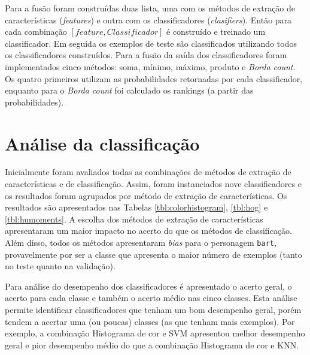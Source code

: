 \documentclass[journal]{IEEEtran}
\begin{document}
Para a fusão foram construídas duas lista, uma com os métodos de extração de características ({\it features}) e outra com os classificadores ({\it clasifiers}).
Então para cada combinação $[feature, Classificador]$ é construído e treinado um classificador.
Em seguida os exemplos de teste são classificados utilizando todos os classificadores construídos.
Para a fusão da saída dos classificadores foram implementados cinco métodos: soma, mínimo, máximo, produto e {\it Borda count}.
Os quatro primeiros utilizam as probabilidades retornadas por cada classificador, 
enquanto para o {\it Borda count} foi calculado os rankings (a partir das probabilidades).

\section {Análise da classificação}

Inicialmente foram avaliados todas as combinações de métodos de extração de características e de classificação.
Assim, foram instanciados nove classificadores e os resultados foram agrupados por método de extração de características.
Os resultados são apresentados nas Tabelas \ref{tbl:colorhistogram}, \ref{tbl:hog} e \ref{tbl:humoments}.
A escolha dos métodos de extração de características apresentaram um maior impacto no acerto do que os métodos de classificação.
Além disso, todos os métodos apresentaram {\it bias} para o personagem \texttt{bart}, provavelmente por ser a classe que apresenta o maior número de exemplos (tanto no teste quanto na validação).

Para análise do desempenho dos classificadores é apresentado o acerto geral, o acerto para cada classe e também o acerto médio nas cinco classes.
Esta análise permite identificar classificadores que tenham um bom desempenho geral, porém tendem a acertar uma (ou poucas) classes (as que tenham mais exemplos).
Por exemplo, a combinação Histograma de cor e SVM apresentou melhor desempenho geral e pior desempenho médio do que a combinação Histograma de cor e KNN.
\end{document}
